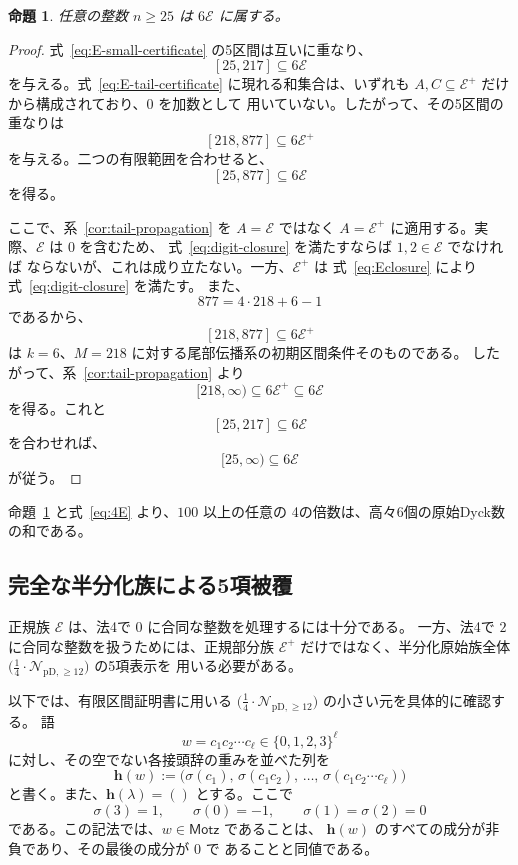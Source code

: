 \documentclass[12pt]{ltjsarticle}
\theoremstyle{plain}
\newtheorem{proposition}[theorem]{命題}
\theoremstyle{definition}
\theoremstyle{plain}
\newcommand{\Pset}{%
  \bigl(\tfrac{1}{4}\cdot\mathcal{N}_{\mathrm{pD},\geq 12}\bigr)%
}
\begin{document}
\begin{proposition}\label{prop:E}
任意の整数 $n\geq25$ は $6\mathcal E$ に属する。
\end{proposition}

\begin{proof}
式~\eqref{eq:E-small-certificate} の5区間は互いに重なり、
\[
 [25,217]\subseteq6\mathcal E
\]
を与える。式~\eqref{eq:E-tail-certificate} に現れる和集合は、いずれも
$A,C\subseteq\mathcal E^+$ だけから構成されており、$0$ を加数として
用いていない。したがって、その5区間の重なりは
\[
 [218,877]\subseteq6\mathcal E^+
\]
を与える。二つの有限範囲を合わせると、
\begin{equation}\label{eq:E-small-cover}
 [25,877]\subseteq6\mathcal E
\end{equation}
を得る。

ここで、系~\ref{cor:tail-propagation} を $A=\mathcal E$ ではなく
$A=\mathcal E^+$ に適用する。実際、$\mathcal E$ は $0$ を含むため、
式~\eqref{eq:digit-closure} を満たすならば $1,2\in\mathcal E$ でなければ
ならないが、これは成り立たない。一方、$\mathcal E^+$ は
式~\eqref{eq:Eclosure} により式~\eqref{eq:digit-closure} を満たす。
また、
\[
 877=4\cdot218+6-1
\]
であるから、
\[
 [218,877]\subseteq6\mathcal E^+
\]
は $k=6$、$M=218$ に対する尾部伝播系の初期区間条件そのものである。
したがって、系~\ref{cor:tail-propagation} より
\[
 [218,\infty)\subseteq6\mathcal E^+\subseteq6\mathcal E
\]
を得る。これと
\[
 [25,217]\subseteq6\mathcal E
\]
を合わせれば、
\[
 [25,\infty)\subseteq6\mathcal E
\]
が従う。
\end{proof}

命題~\ref{prop:E} と式~\eqref{eq:4E} より、$100$ 以上の任意の
4の倍数は、高々6個の原始Dyck数の和である。

\subsection{完全な半分化族による5項被覆}

正規族 $\mathcal E$ は、法4で $0$ に合同な整数を処理するには十分である。
一方、法4で $2$ に合同な整数を扱うためには、正規部分族
$\mathcal E^+$ だけではなく、半分化原始族全体 $\Pset$ の5項表示を
用いる必要がある。

以下では、有限区間証明書に用いる $\Pset$ の小さい元を具体的に確認する。
語
\[
 w=c_1c_2\cdots c_\ell\in\{0,1,2,3\}^{\ell}
\]
に対し、その空でない各接頭辞の重みを並べた列を
\[
 \mathbf h(w):=
 \bigl(
 \sigma(c_1),\,
 \sigma(c_1c_2),\,
 \ldots,\,
 \sigma(c_1c_2\cdots c_\ell)
 \bigr)
\]
と書く。また、$\mathbf h(\lambda)=()$ とする。ここで
\[
 \sigma(3)=1,\qquad
 \sigma(0)=-1,\qquad
 \sigma(1)=\sigma(2)=0
\]
である。この記法では、$w\in\mathsf{Motz}$ であることは、
$\mathbf h(w)$ のすべての成分が非負であり、その最後の成分が $0$ で
あることと同値である。
\end{document}
